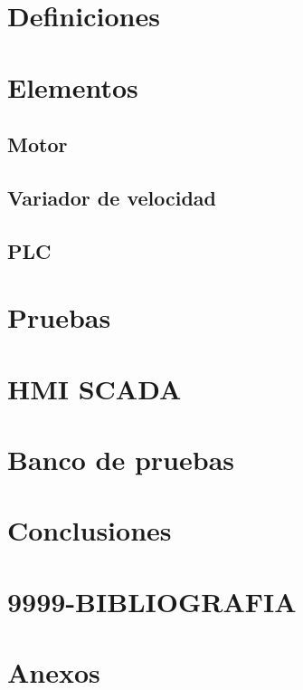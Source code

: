 \documentclass[12pt,a4paper]{article}
\begin{document}
\section{Definiciones}


\section{Elementos}
\subsection{Motor}


\subsection{Variador de velocidad}

	
\subsection{PLC}

	
\section{Pruebas}


\section{HMI SCADA}


\section{Banco de pruebas}





\section{Conclusiones}


\section{9999-BIBLIOGRAFIA}

\section{Anexos}

\end{document}
